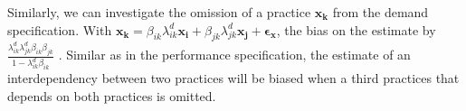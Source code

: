 \documentclass[12pt]{article}
\begin{document}
Similarly, we can investigate the omission of a practice $\mathbf{x_k}$ from the demand specification. With $\mathbf{x_k} = \beta_{ik} \lambda^d_{ik} \mathbf{x_i} + \beta_{jk} \lambda^d_{jk} \mathbf{x_j} + \mathbf{\epsilon_x}$, the bias on the estimate by $\frac{\lambda^d_{ik} \lambda^d_{jk} \beta_{ik} \beta_{jk}}{1 - \lambda^d_{ik} \beta_{ik}}$ . Similar as in the performance specification, the estimate of an interdependency between two practices will be biased when a third practices that depends on both practices is omitted. 


% 
% 
% 
% 
% 
% 
% 
\newpage



\end{document}
